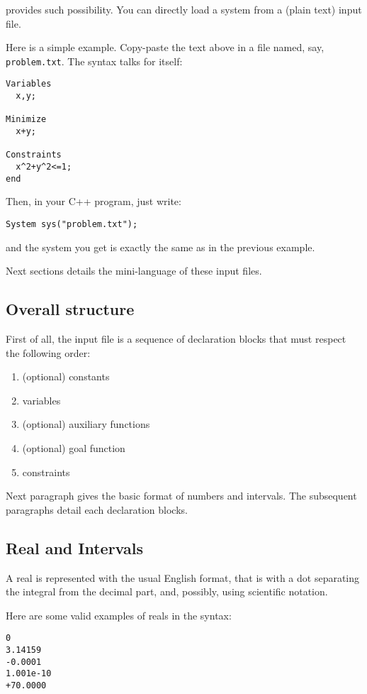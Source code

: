 \ibex provides such possibility. You can directly load a system from a (plain text) input file.

Here is a simple example. Copy-paste the text above in a file named, say, {\tt problem.txt}. 
The syntax talks for itself:

\begin{verbatim}
Variables
  x,y;

Minimize
  x+y;

Constraints
  x^2+y^2<=1;
end
\end{verbatim}

Then, in your C++ program, just write:

\begin{lstlisting}
System sys("problem.txt");
\end{lstlisting}

and the system you get is exactly the same as in the previous example.

Next sections details the mini-language of these input files. 

\subsection{Overall structure}
First of all, the input file is a sequence of declaration blocks that must respect the following order:
\begin{enumerate}
\item (optional) constants
\item variables
\item (optional) auxiliary functions
\item (optional) goal function
\item constraints
\end{enumerate}

Next paragraph gives the basic format of numbers and intervals.
The subsequent paragraphs detail each declaration blocks.

\subsection{Real and Intervals}
A real is represented with the usual English format, that is
with a dot separating the integral from the decimal part,
and, possibly, using scientific notation.

Here are some valid examples of reals in the syntax:
\begin{verbatim}
0
3.14159
-0.0001
1.001e-10
+70.0000
\end{verbatim}
 
